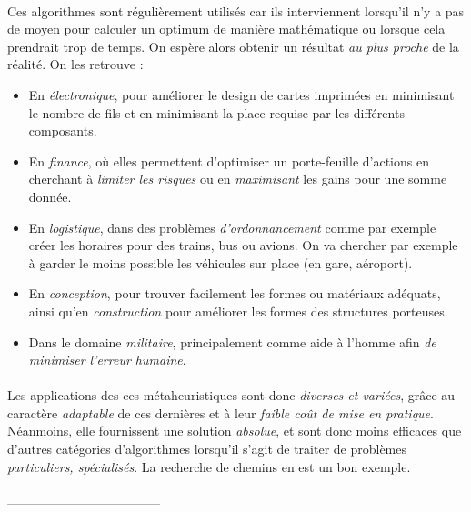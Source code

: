 \paragraph{} Ces algorithmes sont régulièrement utilisés car ils interviennent lorsqu'il n'y a pas de moyen pour 
calculer un optimum de manière mathématique ou lorsque cela prendrait trop de temps. On espère alors obtenir un
résultat \emph{au plus proche} de la réalité. On les retrouve :
\begin{itemize}
    \item En \emph{électronique}, pour améliorer le design de cartes imprimées en minimisant le nombre de fils et 
    en minimisant la place requise par les différents composants.
    \item En \emph{finance}, où elles permettent d'optimiser un porte-feuille d'actions en cherchant à \emph{limiter
    les risques} ou en \emph{maximisant} les gains pour une somme donnée.
    \item En \emph{logistique}, dans des problèmes \emph{d'ordonnancement} comme par exemple créer les horaires pour
    des trains, bus ou avions. On va chercher par exemple à garder le moins possible les véhicules sur place (en gare, 
    aéroport).
    \item En \emph{conception}, pour trouver facilement les formes ou matériaux adéquats, ainsi qu'en \emph{construction}
    pour améliorer les formes des structures porteuses.
    \item Dans le domaine \emph{militaire}, principalement comme aide à l'homme afin \emph{de minimiser l'erreur
    humaine}. 
\end{itemize}

\paragraph{} Les applications des ces métaheuristiques sont donc \emph{diverses et variées}, grâce au caractère \emph{
adaptable} de ces dernières et à leur \emph{faible coût de mise en pratique}. Néanmoins, elle fournissent une
solution \emph{absolue}, et sont donc moins efficaces que d'autres catégories d'algorithmes lorsqu'il s'agit de traiter
de problèmes \emph{particuliers, spécialisés}. La recherche de chemins en est un bon exemple. 

\paragraph{} ------------------------------------


